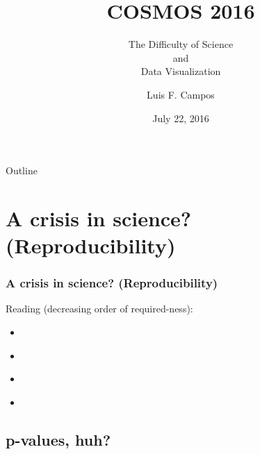 \documentclass{beamer} %
\title[COSMOS 2016]{COSMOS 2016}
\subtitle{ The Difficulty of Science\\and\\Data Visualization}
\author{Luis F. Campos}
\institute{Department of Statistics \\ Harvard University }
\date{July 22, 2016}
\newcommand{\1}{\mathbb{1}}
\begin{document}

\begin{frame}
	\titlepage	
\end{frame}
\begin{frame}{Outline}
  \tableofcontents
\end{frame}



\section{A crisis in science? (Reproducibility)}

\begin{frame}[t]\frametitle{A crisis in science? (Reproducibility)}
\vspace{3mm}
Reading (decreasing order of required-ness):\\
\vspace{3mm}
\begin{itemize}
	\item \href{http://www.nature.com/news/statisticians-issue-warning-over-misuse-of-p-values-1.19503}{}\\	
	\item \href{http://fivethirtyeight.com/features/science-isnt-broken/}{}\\	
	\item \href{http://www.nature.com/news/scientific-method-statistical-errors-1.14700}{}\\	
	\item \href{http://marginalrevolution.com/marginalrevolution/2016/07/results-free-review.html}{}\\	
\end{itemize}

\end{frame}


\subsection{p-values, huh?}
\end{document}
